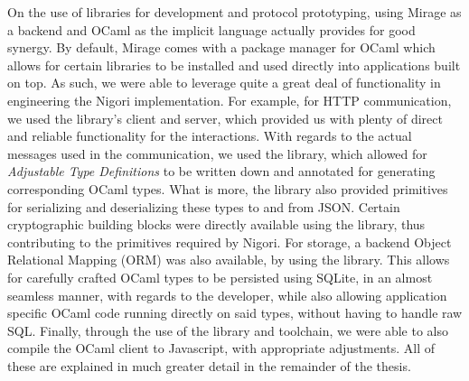 
On the use of libraries for development and protocol prototyping, using Mirage as a backend and OCaml as the implicit language actually provides for good synergy.
By default, Mirage comes with a package manager for OCaml which allows for certain libraries to be installed and used directly into applications built on top.
As such, we were able to leverage quite a great deal of functionality in engineering the Nigori implementation.
For example, for HTTP communication, we used the  library's client and server, which provided us with plenty of direct and reliable functionality for the interactions.
With regards to the actual messages used in the communication, we used the  library, which allowed for \textit{Adjustable Type Definitions} to be written down and annotated for generating corresponding OCaml types.
What is more, the library also provided primitives for serializing and deserializing these types to and from JSON.
Certain cryptographic building blocks were directly available using the  library, thus contributing to the primitives required by Nigori.
For storage, a backend Object Relational Mapping (ORM) was also available, by using the  library.
This allows for carefully crafted OCaml types to be persisted using SQLite, in an almost seamless manner, with regards to the developer, while also allowing application specific OCaml code running directly on said types, without having to handle raw SQL.
Finally, through the use of the  library and toolchain, we were able to also compile the OCaml client to Javascript, with appropriate adjustments.
All of these are explained in much greater detail in the remainder of the thesis.
